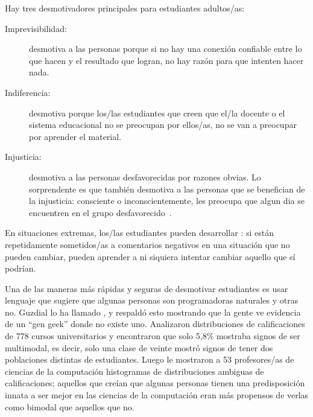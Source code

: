 Hay tres desmotivadores principales para estudiantes adultos/as:

\begin{description}

\item[Imprevisibilidad:]
  desmotiva a las personas porque
  si no hay una conexión confiable entre lo que hacen y el resultado que logran,
  no hay razón para que intenten hacer nada.


\item[Indiferencia:]
  desmotiva porque
  los/las estudiantes que creen que el/la docente o el sistema educacional no se preocupan por ellos/as,
  no se van a preocupar por aprender el material.

\item[Injusticia:]
  desmotiva a las personas desfavorecidas por razones obvias.
  Lo sorprendente es que también desmotiva a las personas que se benefician de la injusticia:
  consciente o inconscientemente,
  les preocupa que
  algun dia se encuentren en el grupo desfavorecido~\cite{Wilk2011}.

\end{description}

En situaciones extremas,
los/las estudiantes pueden desarrollar :
si están repetidamente sometidos/as a comentarios negativos en una situación que no pueden cambiar,
pueden aprender a ni siquiera intentar cambiar aquello que sí podrían.

Una de las maneras más rápidas y seguras de desmotivar estudiantes es
usar lenguaje que sugiere que algunas personas son programadoras naturales y otras no.
Guzdial lo ha llamado
,
y \cite{Pati2016} respaldó esto mostrando que
la gente ve evidencia de un ``gen geek'' donde no existe uno.
Analizaron distribuciones de calificaciones de 778 cursos universitarios y encontraron que solo 5,8\% mostraba signos
de ser multimodal,
es decir, solo una clase de veinte mostró signos de tener dos poblaciones distintas de estudiantes.
Luego le mostraron a 53 profesores/as de ciencias de la computación histogramas de distribuciones ambiguas de calificaciones;
aquellos que creían que algunas personas tienen una predisposición innata a ser mejor en las ciencias de la computación
eran más propensos de verlas como bimodal que aquellos que no.

